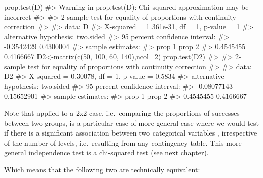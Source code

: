 \documentclass[
  letterpaper,
  DIV=11,
  numbers=noendperiod]{scrreprt}
\newenvironment{Shaded}{\begin{snugshade}}{\end{snugshade}}
\newcommand{\AttributeTok}[1]{\textcolor[rgb]{0.40,0.45,0.13}{#1}}
\newcommand{\CommentTok}[1]{\textcolor[rgb]{0.37,0.37,0.37}{#1}}
\newcommand{\DecValTok}[1]{\textcolor[rgb]{0.68,0.00,0.00}{#1}}
\newcommand{\FunctionTok}[1]{\textcolor[rgb]{0.28,0.35,0.67}{#1}}
\newcommand{\NormalTok}[1]{\textcolor[rgb]{0.00,0.23,0.31}{#1}}
\newcommand{\OtherTok}[1]{\textcolor[rgb]{0.00,0.23,0.31}{#1}}
\begin{document}
\begin{Shaded}
\begin{Highlighting}[]
\FunctionTok{prop.test}\NormalTok{(D)}
\CommentTok{\#\textgreater{} Warning in prop.test(D): Chi{-}squared approximation may be incorrect}
\CommentTok{\#\textgreater{} }
\CommentTok{\#\textgreater{}  2{-}sample test for equality of proportions with continuity correction}
\CommentTok{\#\textgreater{} }
\CommentTok{\#\textgreater{} data:  D}
\CommentTok{\#\textgreater{} X{-}squared = 1.361e{-}31, df = 1, p{-}value = 1}
\CommentTok{\#\textgreater{} alternative hypothesis: two.sided}
\CommentTok{\#\textgreater{} 95 percent confidence interval:}
\CommentTok{\#\textgreater{}  {-}0.3542429  0.4300004}
\CommentTok{\#\textgreater{} sample estimates:}
\CommentTok{\#\textgreater{}    prop 1    prop 2 }
\CommentTok{\#\textgreater{} 0.4545455 0.4166667}
\NormalTok{D2}\OtherTok{\textless{}{-}}\FunctionTok{matrix}\NormalTok{(}\FunctionTok{c}\NormalTok{(}\DecValTok{50}\NormalTok{, }\DecValTok{100}\NormalTok{, }\DecValTok{60}\NormalTok{, }\DecValTok{140}\NormalTok{),}\AttributeTok{ncol=}\DecValTok{2}\NormalTok{)}
\FunctionTok{prop.test}\NormalTok{(D2)}
\CommentTok{\#\textgreater{} }
\CommentTok{\#\textgreater{}  2{-}sample test for equality of proportions with continuity correction}
\CommentTok{\#\textgreater{} }
\CommentTok{\#\textgreater{} data:  D2}
\CommentTok{\#\textgreater{} X{-}squared = 0.30078, df = 1, p{-}value = 0.5834}
\CommentTok{\#\textgreater{} alternative hypothesis: two.sided}
\CommentTok{\#\textgreater{} 95 percent confidence interval:}
\CommentTok{\#\textgreater{}  {-}0.08077143  0.15652901}
\CommentTok{\#\textgreater{} sample estimates:}
\CommentTok{\#\textgreater{}    prop 1    prop 2 }
\CommentTok{\#\textgreater{} 0.4545455 0.4166667}
\end{Highlighting}
\end{Shaded}

Note that applied to a 2x2 case, i.e.~comparing the proportions of
successes between two groups, is a particular case of more general case
where we would test if there is a significant association between two
categorical variables , irrespective of the number of levels,
i.e.~resulting from any contingency table. This more general
independence test is a chi-squared test (see next chapter).

Which means that the following two are technically equivalent:
\end{document}
